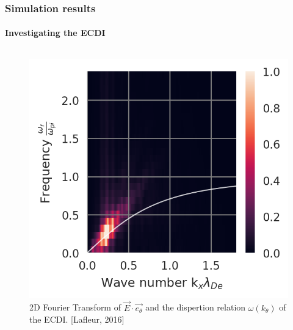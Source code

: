 \documentclass[sans, aspectratio=169]{beamer}
\begin{document}
\begin{frame} 
	\frametitle{Simulation results} 
	\framesubtitle{ Investigating the ECDI } 
	
	
	\begin{columns}

	\begin{column}{0.55\linewidth}
	
		\begin{figure}[hbtp]
			\centering
			\includegraphics[scale=0.6]{images/2D_FFT.png}  %
			\caption{2D Fourier Transform of $\overrightarrow{E} \cdot \overrightarrow{e_{\theta}}$ and the dispertion relation $\omega(k_{\theta})$ of the ECDI. [Lafleur, 2016]}
		\end{figure}
		
	\end{column}
	

\end{columns}
\end{frame}
\end{document}
